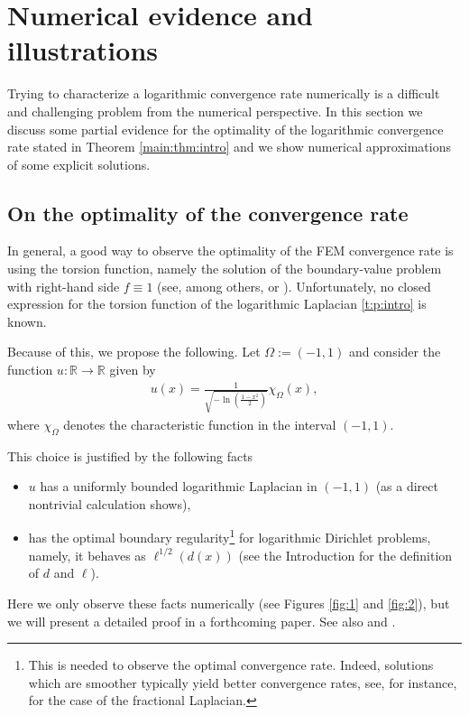 \documentclass[10 pt]{article}
\numberwithin{equation}{section}
\def\R{\mathbb{R}}
\begin{document}
\section{Numerical evidence and illustrations}\label{sec:numerics}

Trying to characterize a logarithmic convergence rate numerically is a difficult and challenging problem from the numerical perspective. In this section we discuss some partial evidence for the optimality of the logarithmic convergence rate stated in Theorem \ref{main:thm:intro} and we show numerical approximations of some explicit solutions.  

\subsection{On the optimality of the convergence rate}

In general, a good way to observe the optimality of the FEM convergence rate is using the torsion function, namely the solution of the boundary-value problem with right-hand side $f\equiv 1$ (see, among others, \cite[Section 5]{AB17} or \cite[Section 5]{BHS19}). Unfortunately, no closed expression for the torsion function of the logarithmic Laplacian \eqref{t:p:intro} is known.

Because of this, we propose the following. Let $\Omega:=(-1,1)$ and consider the function $u:\R\to\R$ given by
\begin{align}\label{udef}
 u(x)=\frac{1}{\sqrt{-\ln\left(\frac{1-x^2}{2}\right)}} \chi_{\Omega}(x),
\end{align}
where $\chi_{\Omega}$ denotes the characteristic function in the interval $(-1,1)$.

This choice is justified by the following facts
\begin{itemize}
 \item $u$ has a uniformly bounded logarithmic Laplacian in $(-1,1)$ (as a direct nontrivial calculation shows),
 \item has the optimal boundary regularity\footnote{This is needed to observe the optimal convergence rate. Indeed, solutions which are smoother typically yield better convergence rates, see, for instance, \cite[Section 5 and Table 2]{AB17} for the case of the fractional Laplacian.} for logarithmic Dirichlet problems, namely, it behaves as $\ell^{1/2}(d(x))$ (see the Introduction for the definition of $d$ and $\ell$).
\end{itemize}
 Here we only observe these facts numerically (see Figures \ref{fig:1} and \ref{fig:2}), but we will present a detailed proof in a forthcoming paper. See also \cite[Theorem 1.11]{CW19} and \cite[Remark~1.5]{FJW22}.
\end{document}
